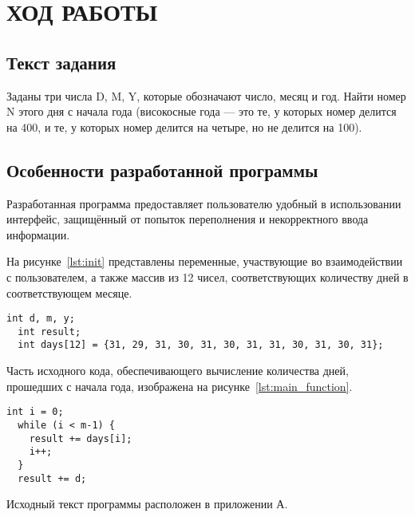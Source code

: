 
\section{ХОД РАБОТЫ}

\subsection{Текст задания}

Заданы три числа D, M, Y, которые обозначают число, месяц и год. Найти номер N этого дня с начала года (високосные года --- это те, у которых номер делится на 400, и те, у которых номер делится на четыре, но не делится на 100).

\subsection{Особенности разработанной программы}

Разработанная программа предоставляет пользователю удобный в использовании интерфейс, защищённый от попыток переполнения и некорректного ввода информации.

На рисунке~\ref{lst:init} представлены переменные, участвующие во взаимодействии с пользователем, а также массив из 12 чисел, соответствующих количеству дней в соответствующем месяце.

\begin{lstlisting}[caption=Объявление переменных и инициализация массива,label=lst:init]
  int d, m, y;
  int result;
  int days[12] = {31, 29, 31, 30, 31, 30, 31, 31, 30, 31, 30, 31};  
\end{lstlisting}

Часть исходного кода, обеспечивающего вычисление количества дней, прошедших с начала года, изображена на рисунке~\ref{lst:main_function}.

\begin{lstlisting}[caption=Вычисление количества дней,label=lst:main_function]
  int i = 0;
  while (i < m-1) {
    result += days[i];
    i++;
  }
  result += d;
\end{lstlisting}

Исходный текст программы расположен в приложении А.

\newpage